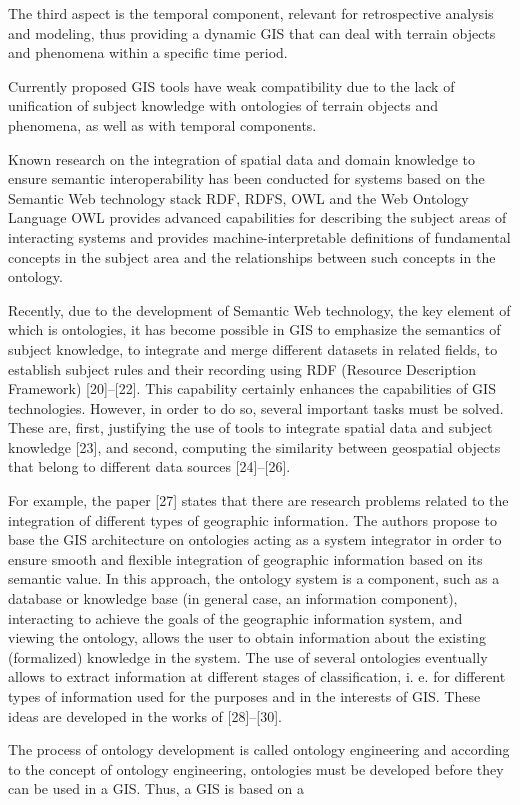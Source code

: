 \documentclass[a4paper]{article}
\begin{document}
\begin{multicols}{2}
{The third aspect is the temporal component, relevant
for retrospective analysis and modeling, thus providing
a dynamic GIS that can deal with terrain objects and
phenomena within a specific time period.\par
Currently proposed GIS tools have weak compatibility due to the lack of unification of subject knowledge
with ontologies of terrain objects and phenomena, as well
as with temporal components.\par
Known research on the integration of spatial data and
domain knowledge to ensure semantic interoperability
has been conducted for systems based on the Semantic
Web technology stack RDF, RDFS, OWL and the Web
Ontology Language OWL provides advanced capabilities
for describing the subject areas of interacting systems
and provides machine-interpretable definitions of fundamental concepts in the subject area and the relationships
between such concepts in the ontology.\par
Recently, due to the development of Semantic Web
technology, the key element of which is ontologies, it
has become possible in GIS to emphasize the semantics
of subject knowledge, to integrate and merge different
datasets in related fields, to establish subject rules and
their recording using RDF (Resource Description Framework) [20]–[22]. This capability certainly enhances the
capabilities of GIS technologies. However, in order to
do so, several important tasks must be solved. These
are, first, justifying the use of tools to integrate spatial
data and subject knowledge [23], and second, computing the similarity between geospatial objects that belong to
different data sources [24]–[26].\par
For example, the paper [27] states that there are
research problems related to the integration of different
types of geographic information. The authors propose
to base the GIS architecture on ontologies acting as a
system integrator in order to ensure smooth and flexible integration of geographic information based on its
semantic value. In this approach, the ontology system is
a component, such as a database or knowledge base (in
general case, an information component), interacting to
achieve the goals of the geographic information system,
and viewing the ontology, allows the user to obtain
information about the existing (formalized) knowledge
in the system. The use of several ontologies eventually
allows to extract information at different stages of classification, i. e. for different types of information used for
the purposes and in the interests of GIS. These ideas are
developed in the works of [28]–[30].\par
The process of ontology development is called ontology engineering and according to the concept of ontology
engineering, ontologies must be developed before they
can be used in a GIS. Thus, a GIS is based on a


}
\end{multicols}
\end{document}
